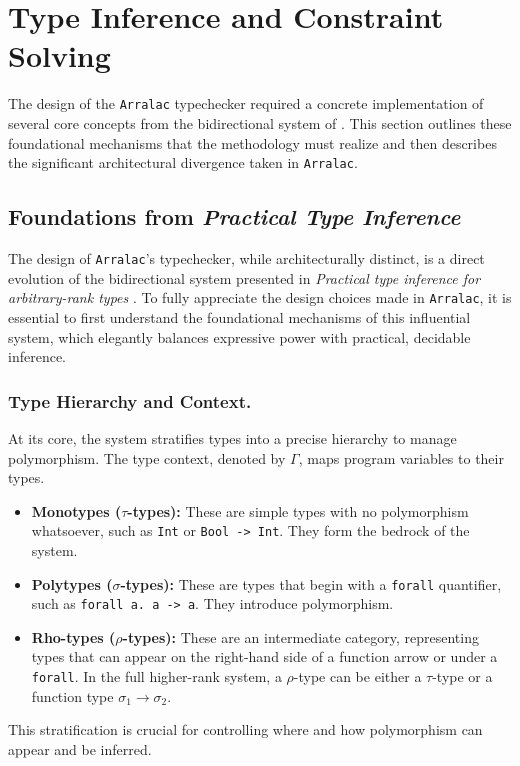 \section{Type Inference and Constraint Solving}
\label{sec:Design:TypeInference}

The design of the \texttt{Arralac} typechecker required a concrete implementation of several core concepts from the bidirectional system of \cite{jones-practical-2007}. This section outlines these foundational mechanisms that the methodology must realize and then describes the significant architectural divergence taken in \texttt{Arralac}.

\subsection{Foundations from \textit{Practical Type Inference}}
\label{sec:Design:Foundations}

The design of \texttt{Arralac}'s typechecker, while architecturally distinct, is a direct evolution of the bidirectional system presented in \textit{Practical type inference for arbitrary-rank types} \cite{jones-practical-2007}. To fully appreciate the design choices made in \texttt{Arralac}, it is essential to first understand the foundational mechanisms of this influential system, which elegantly balances expressive power with practical, decidable inference.

\subsubsection{Type Hierarchy and Context.}
At its core, the system stratifies types into a precise hierarchy to manage polymorphism. The type context, denoted by \textbf{$\Gamma$}, maps program variables to their types.
\begin{itemize}
    \item \textbf{Monotypes ($\tau$-types):} These are simple types with no polymorphism whatsoever, such as \texttt{Int} or \texttt{Bool -> Int}. They form the bedrock of the system.
    \item \textbf{Polytypes ($\sigma$-types):} These are types that begin with a \texttt{forall} quantifier, such as \texttt{forall a. a -> a}. They introduce polymorphism.
    \item \textbf{Rho-types ($\rho$-types):} These are an intermediate category, representing types that can appear on the right-hand side of a function arrow or under a \texttt{forall}. In the full higher-rank system, a $\rho$-type can be either a $\tau$-type or a function type $\sigma_1 \rightarrow \sigma_2$.
\end{itemize}
This stratification is crucial for controlling where and how polymorphism can appear and be inferred.

